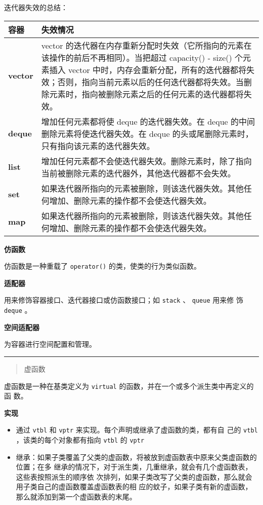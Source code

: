 迭代器失效的总结：
\begin{center}
  \begin{tabular}{lp{24em}}
    \hline
    容器 & 失效情况 \\
    \hline
    \textbf{\ttfamily vector} & vector 的迭代器在内存重新分配时失效（它所指向的元素在该操作的前后不再相同）。当把超过 capacity() - size() 个元素插入 vector 中时，内存会重新分配，所有的迭代器都将失效；否则，指向当前元素以后的任何迭代器都将失效。当删除元素时，指向被删除元素之后的任何元素的迭代器都将失效。 \\
    \textbf{\ttfamily deque}  & 增加任何元素都将使 deque 的迭代器失效。在 deque 的中间删除元素将使迭代器失效。在 deque 的头或尾删除元素时，只有指向该元素的迭代器失效。 \\
    \textbf{\ttfamily list}   & 增加任何元素都不会使迭代器失效。删除元素时，除了指向当前被删除元素的迭代器外，其他迭代器都不会失效。 \\
    \textbf{\ttfamily set} & 如果迭代器所指向的元素被删除，则该迭代器失效。其他任何增加、删除元素的操作都不会使迭代器失效。 \\
    \textbf{\ttfamily map} & 如果迭代器所指向的元素被删除，则该迭代器失效。其他任何增加、删除元素的操作都不会使迭代器失效。 \\
    \hline
  \end{tabular}
\end{center}

\noindent\textbf{仿函数}

仿函数是一种重载了 \verb|operator()| 的类，使类的行为类似函数。

\noindent\textbf{适配器}

用来修饰容器接口、迭代器接口或仿函数接口；如 \verb|stack| 、 \verb|queue| 用来修
饰 \verb|deque| 。

\noindent\textbf{空间适配器}

为容器进行空间配置和管理。


\noindent\rule[0.25\baselineskip]{\textwidth}{1pt}

\begin{quotation}
  {\color{red}虚函数}
\end{quotation}

虚函数是一种在基类定义为 \verb|virtual| 的函数，并在一个或多个派生类中再定义的函
数。

\noindent\textbf{实现}

\begin{itemize}
\item 通过 \verb|vtbl| 和 \verb|vptr| 来实现。每个声明或继承了虚函数的类，都有自
  己的 \verb|vtbl| ，该类的每个对象都有指向 \verb|vtbl| 的 \verb|vptr|
\item 继承：如果子类覆盖了父类的虚函数，将被放到虚函数表中原来父类虚函数的位置；在多
  继承的情况下，对于派生类，几重继承，就会有几个虚函数表，这些表按照派生的顺序依
  次排列，如果子类改写了父类的虚函数，那么就会用子类自己的虚函数覆盖虚函数表的相
  应的蚊子，如果子类有新的虚函数，那么就添加到第一个虚函数表的末尾。
\end{itemize}

